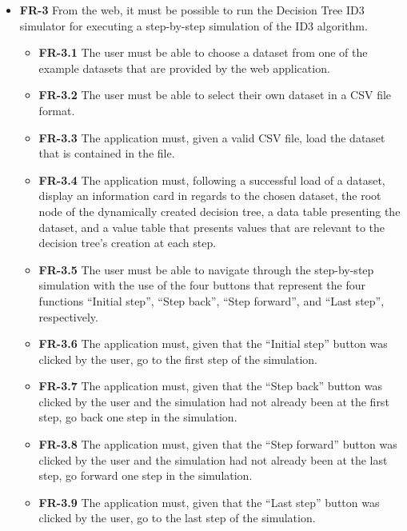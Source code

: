 \begin{itemize}
    \item \textbf{FR-3} From the web, it must be possible to run the Decision Tree ID3 simulator for executing a step-by-step simulation of the ID3 algorithm.
    \begin{itemize}
        \item \textbf{FR-3.1} The user must be able to choose a dataset from one of the example datasets that are provided by the web application.
        \item \textbf{FR-3.2} The user must be able to select their own dataset in a CSV file format.
        \item \textbf{FR-3.3} The application must, given a valid CSV file, load the dataset that is contained in the file.
        \item \textbf{FR-3.4} The application must, following a successful load of a dataset, display an information card in regards to the chosen dataset, the root node of the dynamically created decision tree, a data table presenting the dataset, and a value table that presents values that are relevant to the decision tree's creation at each step.
        \item \textbf{FR-3.5} The user must be able to navigate through the step-by-step simulation with the use of the four buttons that represent the four functions ``Initial step'', ``Step back'', ``Step forward'', and ``Last step'', respectively.
        \item \textbf{FR-3.6} The application must, given that the ``Initial step'' button was clicked by the user, go to the first step of the simulation.
        \item \textbf{FR-3.7} The application must, given that the ``Step back'' button was clicked by the user and the simulation had not already been at the first step, go back one step in the simulation.
        \item \textbf{FR-3.8} The application must, given that the ``Step forward'' button was clicked by the user and the simulation had not already been at the last step, go forward one step in the simulation.
        \item \textbf{FR-3.9} The application must, given that the ``Last step'' button was clicked by the user, go to the last step of the simulation.
    \end{itemize}
\end{itemize}

